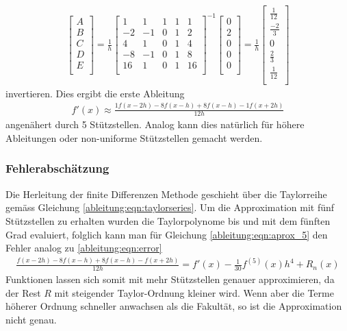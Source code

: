 \begin{align}
\begin{bmatrix}
A \\
B \\
C \\
D \\
E \\
\end{bmatrix}
=
\frac{1}{h}
\begin{bmatrix}
1 & 1 & 1 & 1 & 1 \\
-2 & -1 & 0 & 1 & 2 \\
4 & 1 & 0 & 1 & 4 \\
-8 & -1 & 0 & 1 & 8 \\
16 & 1 & 0 & 1 & 16 \\
\end{bmatrix}^{-1}
\begin{bmatrix}
0 \\
2 \\
0 \\
0 \\
0 \\
\end{bmatrix}
=
\frac{1}{h}
\begin{bmatrix}
\frac{1}{12} \\
\frac{-2}{3} \\
0 \\
\frac{2}{3} \\
\frac{1}{12} \\
\end{bmatrix}
\end{align}
invertieren.
Dies ergibt die erste Ableitung
\begin{align}
f'(x)  \approx \frac{1f(x-2h) - 8f(x-h) + 8f(x-h) - 1f(x+2h)}{12h}
\label{ableitung:eqn:aprox_5}
\end{align}
angenähert durch 5 Stützstellen.
Analog kann dies natürlich für höhere Ableitungen oder non-uniforme Stützstellen gemacht werden.
\subsubsection{Fehlerabschätzung}
Die Herleitung der finite Differenzen Methode geschieht über die Taylorreihe gemäss Gleichung \ref{ableitung:eqn:taylorseries}. Um die Approximation mit fünf Stützstellen zu erhalten wurden die Taylorpolynome bis und mit dem fünften Grad evaluiert, folglich kann man für Gleichung \ref{ableitung:eqn:aprox_5} den Fehler analog zu \ref{ableitung:eqn:error}
\begin{align}
\frac{f(x-2h) - 8f(x-h) + 8f(x-h) - f(x+2h)}{12h} = f'(x) - \frac{1}{30} f^{(5)} (x)h^{4}+R_n(x)
\label{ableitung:eqn:error}
\end{align}
Funktionen lassen sich somit mit mehr Stützstellen genauer approximieren, da der Rest $R$ mit steigender Taylor-Ordnung kleiner wird. Wenn aber die Terme höherer Ordnung schneller anwachsen als die Fakultät, so ist die Approximation nicht genau.
